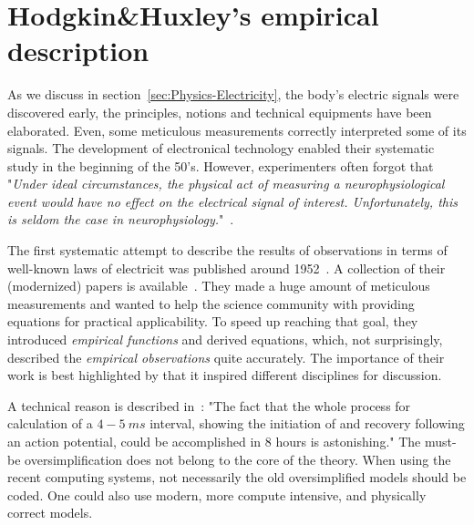 
\section{Hodgkin\&Huxley's empirical description\label{sec:Physiology-HodgkinHuxley}}

As we discuss in section~\ref{sec:Physics-Electricity}, the body's electric signals
were discovered early, the principles, notions and technical equipments have been elaborated.
Even, some meticulous measurements correctly interpreted some of its signals. 
The development of electronical technology enabled their systematic study 
in the beginning of the 50's. However, experimenters 
often forgot that "\textit{Under ideal
circumstances, the physical act of measuring a neurophysiological event
would have no effect on the electrical signal of interest. Unfortunately,
this is seldom the case in neurophysiology.}"~\cite{JohnstonWuNeurophysiology:1995}.
	

The first systematic attempt to describe the results of observations in terms of well-known laws of electricit
 was published around 1952~\cite{HodgkinHuxley:1952}.
A collection of their (modernized) papers is available~\cite{CompanionGuideHodgkinHuxley:2022}.
They made a huge amount of \hypertarget{HHmeasurements}{meticulous measurements}
and wanted to help the science community with providing equations for practical applicability.
To speed up reaching that goal, they introduced \textit{empirical functions} 
and derived equations, which, not surprisingly, described the \textit{empirical observations} quite accurately. 
The importance of their work is best highlighted by that it inspired 
different disciplines for discussion. 


A technical reason is described in~\cite{HodgkinMemoryBook:1992}:
"The fact that the whole process for calculation of a $4-5\ ms$ interval,
showing the initiation of and recovery following an action potential, could be accomplished in 8 hours is astonishing."
The must-be oversimplification does not belong to the core of the theory.
When using the recent computing systems, not necessarily the old oversimplified models should be coded.
One could also use modern, more compute intensive, and physically correct models.

